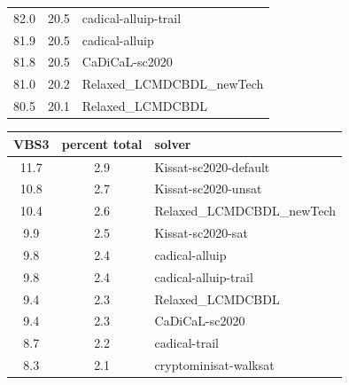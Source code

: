 \documentclass{elsarticle}
\begin{document}
\begin{table}
\begin{center}
\begin{tabular}{ccl}
\phantom{0}82.0 & 20.5 & cadical-alluip-trail \\
\phantom{0}81.9 & 20.5 & cadical-alluip \\
\phantom{0}81.8 & 20.5 & CaDiCaL-sc2020 \\
\phantom{0}81.0 & 20.2 & Relaxed\_LCMDCBDL\_newTech \\
\phantom{0}80.5 & 20.1 & Relaxed\_LCMDCBDL \\
\end{tabular}
\end{center}
\begin{center}
\begin{tabular}{ccl}
VBS3 & percent total & solver \\
\hline
11.7 & 2.9 & Kissat-sc2020-default \\
10.8 & 2.7 & Kissat-sc2020-unsat \\
10.4 & 2.6 & Relaxed\_LCMDCBDL\_newTech \\
\phantom{0}9.9 & 2.5 & Kissat-sc2020-sat \\
\phantom{0}9.8 & 2.4 & cadical-alluip \\
\phantom{0}9.8 & 2.4 & cadical-alluip-trail \\
\phantom{0}9.4 & 2.3 & Relaxed\_LCMDCBDL \\
\phantom{0}9.4 & 2.3 & CaDiCaL-sc2020 \\
\phantom{0}8.7 & 2.2 & cadical-trail \\
\phantom{0}8.3 & 2.1 & cryptominisat-walksat \\
\end{tabular}
\end{center}
\end{table}
\end{document}
